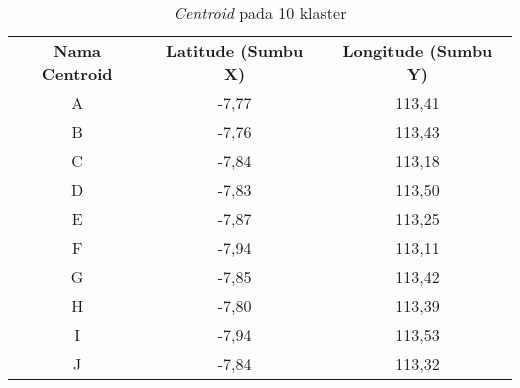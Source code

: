 \begin{table}[H]
\centering
\footnotesize
\begin{tabular}{ccc}
\rowcolor[HTML]{4472C4} 
{\color[HTML]{FFFFFF} \textbf{Nama   Centroid}} & {\color[HTML]{FFFFFF} \textbf{Latitude (Sumbu X)}} & {\color[HTML]{FFFFFF} \textbf{Longitude (Sumbu Y)}} \\
\rowcolor[HTML]{D9E1F2} 
A & -7,77 & 113,41 \\
B & -7,76 & 113,43 \\
\rowcolor[HTML]{D9E1F2} 
C & -7,84 & 113,18 \\
D & -7,83 & 113,50 \\
\rowcolor[HTML]{D9E1F2} 
E & -7,87 & 113,25 \\
F & -7,94 & 113,11 \\
\rowcolor[HTML]{D9E1F2} 
G & -7,85 & 113,42 \\
H & -7,80 & 113,39 \\
\rowcolor[HTML]{D9E1F2} 
I & -7,94 & 113,53 \\
J & -7,84 & 113,32
\end{tabular}
\caption{\textit{Centroid} pada 10 klaster}
\label{tab:center10}
\end{table}
